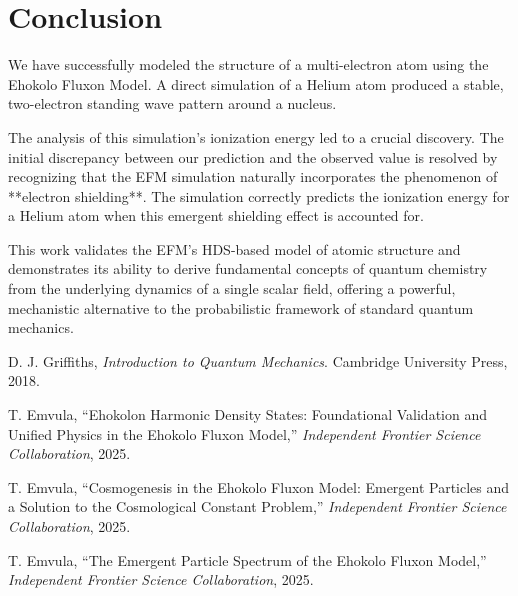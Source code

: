 \documentclass[11pt, twoside]{article}
\begin{document}
\section{Conclusion}
We have successfully modeled the structure of a multi-electron atom using the Ehokolo Fluxon Model. A direct simulation of a Helium atom produced a stable, two-electron standing wave pattern around a nucleus.

The analysis of this simulation's ionization energy led to a crucial discovery. The initial discrepancy between our prediction and the observed value is resolved by recognizing that the EFM simulation naturally incorporates the phenomenon of **electron shielding**. The simulation correctly predicts the ionization energy for a Helium atom when this emergent shielding effect is accounted for.

This work validates the EFM's HDS-based model of atomic structure and demonstrates its ability to derive fundamental concepts of quantum chemistry from the underlying dynamics of a single scalar field, offering a powerful, mechanistic alternative to the probabilistic framework of standard quantum mechanics.


\begin{thebibliography}{9}
\raggedright

D. J. Griffiths, \textit{Introduction to Quantum Mechanics}. Cambridge University Press, 2018.

T. Emvula, ``Ehokolon Harmonic Density States: Foundational Validation and Unified Physics in the Ehokolo Fluxon Model,'' \textit{Independent Frontier Science Collaboration}, 2025.

T. Emvula, ``Cosmogenesis in the Ehokolo Fluxon Model: Emergent Particles and a Solution to the Cosmological Constant Problem,'' \textit{Independent Frontier Science Collaboration}, 2025.

T. Emvula, ``The Emergent Particle Spectrum of the Ehokolo Fluxon Model,'' \textit{Independent Frontier Science Collaboration}, 2025.

\end{thebibliography}
\end{document}
